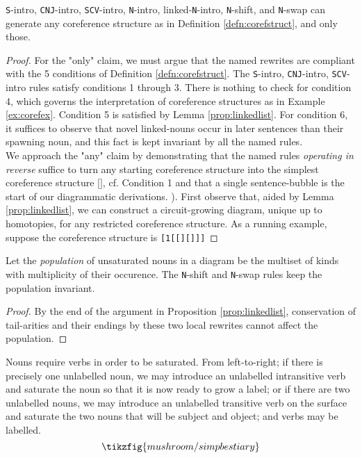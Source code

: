 \begin{proposition}
\texttt{S}-intro, \texttt{CNJ}-intro, \texttt{SCV}-intro, \texttt{N}-intro, linked-\texttt{N}-intro, \texttt{N}-shift, and \texttt{N}-swap can generate any coreference structure as in Definition \ref{defn:corefstruct}, and only those.
\begin{proof}
For the "only" claim, we must argue that the named rewrites are compliant with the 5 conditions of Definition \ref{defn:corefstruct}. The \texttt{S}-intro, \texttt{CNJ}-intro, \texttt{SCV}-intro rules satisfy conditions 1 through 3. There is nothing to check for condition 4, which governs the interpretation of coreference structures as in Example \ref{ex:corefex}. Condition 5 is satisfied by Lemma \ref{prop:linkedlist}. For condition 6, it suffices to observe that novel linked-nouns occur in later sentences than their spawning noun, and this fact is kept invariant by all the named rules.\\
We approach the "any" claim by demonstrating that the named rules \emph{operating in reverse} suffice to turn any starting coreference structure into the simplest coreference structure $\texttt{[]}$, cf. Condition 1 and that a single sentence-bubble is the start of our diagrammatic derivations. ). First observe that, aided by Lemma \ref{prop:linkedlist}, we can construct a circuit-growing diagram, unique up to homotopies, for any restricted coreference structure. As a running example, suppose the coreference structure is \texttt{[1[[][]]]}
\end{proof}
\end{proposition}


\begin{lemma}
Let the \emph{population} of unsaturated nouns in a diagram be the multiset of kinds with multiplicity of their occurence. The \texttt{N}-shift and \texttt{N}-swap rules keep the population invariant.
\begin{proof}
By the end of the argument in Proposition \ref{prop:linkedlist}, conservation of tail-arities and their endings by these two local rewrites cannot affect the population.
\end{proof}
\end{lemma}

Nouns require verbs in order to be saturated. From left-to-right; if there is precisely one unlabelled noun, we may introduce an unlabelled intransitive verb and saturate the noun so that it is now ready to grow a label; or if there are two unlabelled nouns, we may introduce an unlabelled transitive verb on the surface and saturate the two nouns that will be subject and object; and verbs may be labelled.
\[
\tikzfig{mushroom/simpbestiary}
\]


